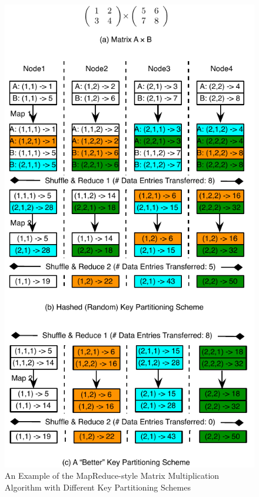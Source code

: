 \documentclass[10pt,journal,compsoc]{IEEEtran}
\begin{document}
\begin{figure}[!t]
\centering
\includegraphics[width=1\columnwidth]{figure1}
\caption{An Example of the MapReduce-style Matrix Multiplication Algorithm with Different Key Partitioning Schemes 
}
\label{fig:matrixExample}
\end{figure}
\end{document}
